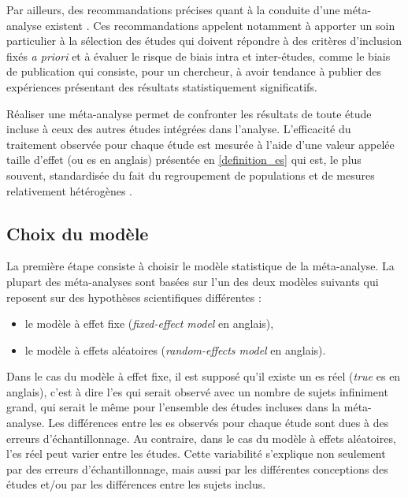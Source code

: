 Par ailleurs, des recommandations précises quant à la conduite d'une méta-analyse existent \citep{Moher2009, Cochrane}. Ces recommandations
appelent notamment à apporter un soin particulier à la sélection des études qui doivent répondre à des critères d'inclusion fixés 
\textit{a priori} et à évaluer le risque de biais intra et inter-études, comme le biais de publication \citep{Higgins2011} qui consiste, 
pour un chercheur, à avoir tendance à publier des expériences présentant des résultats statistiquement significatifs.  

Réaliser une méta-analyse permet de confronter les résultats de toute étude incluse à ceux des autres études intégrées dans l'analyse.
L'efficacité du traitement observée pour chaque étude est mesurée à l'aide d'une valeur appelée taille 
d'effet (ou \gls{es} en anglais) présentée en \ref{definition_es} qui est, le plus souvent, standardisée du fait du regroupement de 
populations et de mesures relativement hétérogènes \citep{Cortese2016}.

\subsection{Choix du modèle} \label{model_choice}

La première étape consiste à choisir le modèle statistique de la méta-analyse. La plupart des méta-analyses sont basées sur l'un des deux modèles 
suivants qui reposent sur des hypothèses scientifiques différentes \citep[Chapitre~10]{Borenstein2009} :
\renewcommand{\labelitemi}{$\bullet$}
\begin{itemize}
\item le modèle à effet fixe (\textit{fixed-effect model} en anglais),
\item le modèle à effets aléatoires (\textit{random-effects model} en anglais).
\end{itemize}

Dans le cas du modèle à effet fixe, il est supposé qu'il existe un \gls{es} réel (\textit{true} \gls{es} en anglais), c'est à dire l'\gls{es} qui serait
observé avec un nombre de sujets infiniment grand, qui serait le même pour l'ensemble des études incluses dans la méta-analyse. Les différences entre
les \gls{es} observés pour chaque étude sont dues à des erreurs d'échantillonnage. Au contraire, dans le cas du modèle à effets aléatoires, 
l'\gls{es} réel peut varier entre les études. Cette variabilité s'explique non seulement par des erreurs d'échantillonnage, mais aussi par 
les différentes conceptions des études et/ou par les différences entre les sujets inclus.

